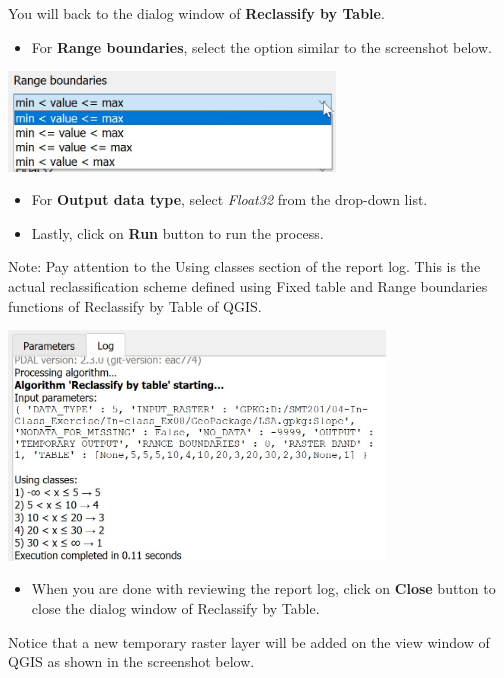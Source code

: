 \documentclass[
  letterpaper,
  DIV=11,
  numbers=noendperiod]{scrreprt}
\providecommand{\tightlist}{%
  \setlength{\itemsep}{0pt}\setlength{\parskip}{0pt}}\usepackage{longtable,booktabs,array}
\begin{document}
You will back to the dialog window of \textbf{Reclassify by Table}.

\begin{itemize}
\tightlist
\item
  For \textbf{Range boundaries}, select the option similar to the
  screenshot below.
\end{itemize}

\includegraphics[width=0.65\textwidth,height=\textheight]{./img08/image3.jpg}

\begin{itemize}
\tightlist
\item
  For \textbf{Output data type}, select \emph{Float32} from the
  drop-down list.
\item
  Lastly, click on \textbf{Run} button to run the process.
\end{itemize}

Note: Pay attention to the Using classes section of the report log. This
is the actual reclassification scheme defined using Fixed table and
Range boundaries functions of Reclassify by Table of QGIS.

\includegraphics[width=0.75\textwidth,height=\textheight]{./img08/image4.jpg}

\begin{itemize}
\tightlist
\item
  When you are done with reviewing the report log, click on
  \textbf{Close} button to close the dialog window of Reclassify by
  Table.
\end{itemize}

Notice that a new temporary raster layer will be added on the view
window of QGIS as shown in the screenshot below.
\end{document}
